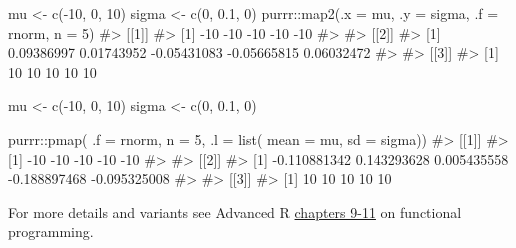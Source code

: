 \documentclass[
  letterpaper,
  DIV=11,
  numbers=noendperiod]{scrreprt}
\newenvironment{Shaded}{\begin{snugshade}}{\end{snugshade}}
\newcommand{\AttributeTok}[1]{\textcolor[rgb]{0.40,0.45,0.13}{#1}}
\newcommand{\CommentTok}[1]{\textcolor[rgb]{0.37,0.37,0.37}{#1}}
\newcommand{\DecValTok}[1]{\textcolor[rgb]{0.68,0.00,0.00}{#1}}
\newcommand{\FloatTok}[1]{\textcolor[rgb]{0.68,0.00,0.00}{#1}}
\newcommand{\FunctionTok}[1]{\textcolor[rgb]{0.28,0.35,0.67}{#1}}
\newcommand{\NormalTok}[1]{\textcolor[rgb]{0.00,0.23,0.31}{#1}}
\newcommand{\OtherTok}[1]{\textcolor[rgb]{0.00,0.23,0.31}{#1}}
\newcommand{\SpecialCharTok}[1]{\textcolor[rgb]{0.37,0.37,0.37}{#1}}
\begin{document}
\begin{Shaded}
\begin{Highlighting}[]
\NormalTok{mu }\OtherTok{\textless{}{-}} \FunctionTok{c}\NormalTok{(}\SpecialCharTok{{-}}\DecValTok{10}\NormalTok{, }\DecValTok{0}\NormalTok{, }\DecValTok{10}\NormalTok{)}
\NormalTok{sigma }\OtherTok{\textless{}{-}} \FunctionTok{c}\NormalTok{(}\DecValTok{0}\NormalTok{, }\FloatTok{0.1}\NormalTok{, }\DecValTok{0}\NormalTok{)}
\NormalTok{purrr}\SpecialCharTok{::}\FunctionTok{map2}\NormalTok{(}\AttributeTok{.x =}\NormalTok{ mu, }\AttributeTok{.y =}\NormalTok{ sigma, }\AttributeTok{.f =}\NormalTok{ rnorm, }\AttributeTok{n =} \DecValTok{5}\NormalTok{)}
\CommentTok{\#\textgreater{} [[1]]}
\CommentTok{\#\textgreater{} [1] {-}10 {-}10 {-}10 {-}10 {-}10}
\CommentTok{\#\textgreater{} }
\CommentTok{\#\textgreater{} [[2]]}
\CommentTok{\#\textgreater{} [1]  0.09386997  0.01743952 {-}0.05431083 {-}0.05665815  0.06032472}
\CommentTok{\#\textgreater{} }
\CommentTok{\#\textgreater{} [[3]]}
\CommentTok{\#\textgreater{} [1] 10 10 10 10 10}
\end{Highlighting}
\end{Shaded}

\begin{Shaded}
\begin{Highlighting}[]
\NormalTok{mu }\OtherTok{\textless{}{-}} \FunctionTok{c}\NormalTok{(}\SpecialCharTok{{-}}\DecValTok{10}\NormalTok{, }\DecValTok{0}\NormalTok{, }\DecValTok{10}\NormalTok{)}
\NormalTok{sigma }\OtherTok{\textless{}{-}} \FunctionTok{c}\NormalTok{(}\DecValTok{0}\NormalTok{, }\FloatTok{0.1}\NormalTok{, }\DecValTok{0}\NormalTok{)}

\NormalTok{purrr}\SpecialCharTok{::}\FunctionTok{pmap}\NormalTok{(}
  \AttributeTok{.f =}\NormalTok{ rnorm, }
  \AttributeTok{n =} \DecValTok{5}\NormalTok{,}
  \AttributeTok{.l =} \FunctionTok{list}\NormalTok{(}
    \AttributeTok{mean =}\NormalTok{ mu, }
    \AttributeTok{sd =}\NormalTok{ sigma))}
\CommentTok{\#\textgreater{} [[1]]}
\CommentTok{\#\textgreater{} [1] {-}10 {-}10 {-}10 {-}10 {-}10}
\CommentTok{\#\textgreater{} }
\CommentTok{\#\textgreater{} [[2]]}
\CommentTok{\#\textgreater{} [1] {-}0.110881342  0.143293628  0.005435558 {-}0.188897468 {-}0.095325008}
\CommentTok{\#\textgreater{} }
\CommentTok{\#\textgreater{} [[3]]}
\CommentTok{\#\textgreater{} [1] 10 10 10 10 10}
\end{Highlighting}
\end{Shaded}

For more details and variants see Advanced R
\href{https://adv-r.hadley.nz/functionals.html}{chapters 9-11} on
functional programming.
\end{document}
